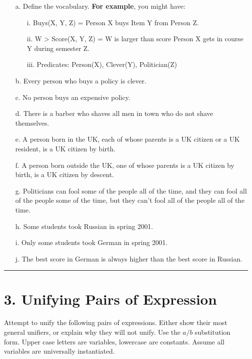 \documentclass[11pt]{article}
\begin{document}
\begin{flushleft}
\begin{enumerate}
    \item[a.] Define the vocabulary. \textbf{For example}, you might have:
        \begin{enumerate} 
            \item[i.] Buys(X, Y, Z) = Person X buys Item Y from Person Z.
            \item[ii.] W > Score(X, Y, Z) = W is larger than score Person X
                gets in course Y during semester Z.
            \item[iii.] Predicates: Person(X), Clever(Y), Politician(Z)
        \end{enumerate}
    \item[b.] Every person who buys a policy is clever.
    \item[c.] No person buys an expensive policy.
    \item[d.] There is a barber who shaves all men in town who do not shave
        themselves.
    \item[e.] A person born in the UK, each of whose parents is a UK
        citizen or a UK resident, is a UK citizen by birth.
    \item[f.] A person born outside the UK, one of whose parents is a UK
        citizen by birth, is a UK citizen by descent.
    \item[g.] Politicians can fool some of the people all of the time, and
        they can fool all of the people some of the time, but they can't
        fool all of the people all of the time.
    \item[h.] Some students took Russian in spring 2001.
    \item[i.] Only some students took German in spring 2001.
    \item[j.] The best score in German is always higher than the best score
        in Russian.

\end{enumerate}

\rule[0.1pt]{40em}{1.0pt}

\section*{3. Unifying Pairs of Expression}  Attempt to unify the following pairs
of expressions.  Either show their most general unifiers, or explain why they
will not unify. Use the ${a/b}$ substitution form. Upper case letters are
variables, lowercase are constants. Assume all variables are universally
instantiated. 

\begin{enumerate}


\end{enumerate}
\end{flushleft}
\end{document}
